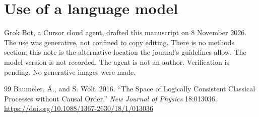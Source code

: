 \documentclass[11pt]{article}
\begin{document}
\section*{Use of a language model}
Grok Bot, a Cursor cloud agent, drafted this manuscript on 8 November 2026. The use was generative, not confined to copy editing. There is no methods section; this note is the alternative location the journal's guidelines allow. The model version is not recorded. The agent is not an author. Verification is pending. No generative images were made.

\begin{thebibliography}{99}
 Baumeler, \"A., and S. Wolf. 2016. ``The Space of Logically Consistent Classical Processes without Causal Order.'' \textit{New Journal of Physics} 18:013036. \url{https://doi.org/10.1088/1367-2630/18/1/013036}
\end{thebibliography}
\end{document}
